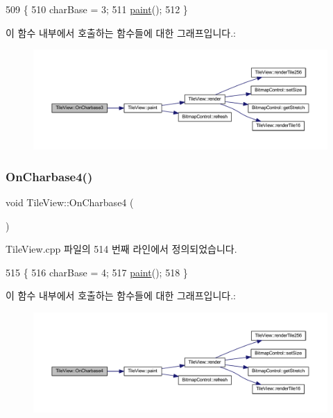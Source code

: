 \begin{DoxyCode}
509 \{
510   charBase = 3;
511   \mbox{\hyperlink{class_tile_view_a4341071a0cab0d5a8b6dfa7318230636}{paint}}();
512 \}
\end{DoxyCode}
이 함수 내부에서 호출하는 함수들에 대한 그래프입니다.\+:
\nopagebreak
\begin{figure}[H]
\begin{center}
\leavevmode
\includegraphics[width=350pt]{class_tile_view_af0ec3a1a2c7e142612fe13d85c4faa63_cgraph}
\end{center}
\end{figure}
\mbox{\label{class_tile_view_abfd5f9562f84ae4903db87425788d410}} 
\subsubsection{\texorpdfstring{On\+Charbase4()}{OnCharbase4()}}
{\footnotesize\ttfamily void Tile\+View\+::\+On\+Charbase4 (\begin{DoxyParamCaption}{ }\end{DoxyParamCaption})\hspace{0.3cm}{\ttfamily [protected]}}



Tile\+View.\+cpp 파일의 514 번째 라인에서 정의되었습니다.


\begin{DoxyCode}
515 \{
516   charBase = 4;
517   \mbox{\hyperlink{class_tile_view_a4341071a0cab0d5a8b6dfa7318230636}{paint}}();
518 \}
\end{DoxyCode}
이 함수 내부에서 호출하는 함수들에 대한 그래프입니다.\+:
\nopagebreak
\begin{figure}[H]
\begin{center}
\leavevmode
\includegraphics[width=350pt]{class_tile_view_abfd5f9562f84ae4903db87425788d410_cgraph}
\end{center}
\end{figure}
\mbox{\label{class_tile_view_a88e865b649c2a32c403670cca70ed55c}} 
